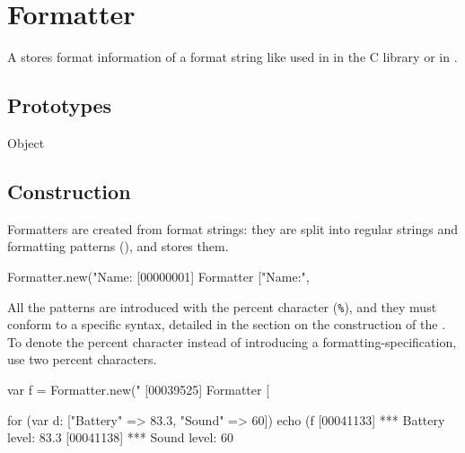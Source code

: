 
\section{Formatter}

A  stores format information of a format string like
used in  in the C library or in .

\subsection{Prototypes}

\begin{refObjects}
\item[Object]
\end{refObjects}

\subsection{Construction}

Formatters are created from format strings: they are split into regular
strings and formatting patterns (), and stores them.

\begin{urbiscript}[firstnumber=1]
Formatter.new("Name:%
[00000001] Formatter ["Name:", %
\end{urbiscript}

All the patterns are introduced with the percent character (\lstinline|%|),
and they must conform to a specific syntax, detailed in the section on the
construction of the .  To denote the percent character
instead of introducing a formatting-specification, use two percent
characters.

\begin{urbiscript}
var f = Formatter.new("%
[00039525] Formatter [%

for (var d: ["Battery" => 83.3, "Sound" => 60])
  echo (f %
[00041133] ***    Battery level: 83.3%
[00041138] ***      Sound level: 60  %
\end{urbiscript}


